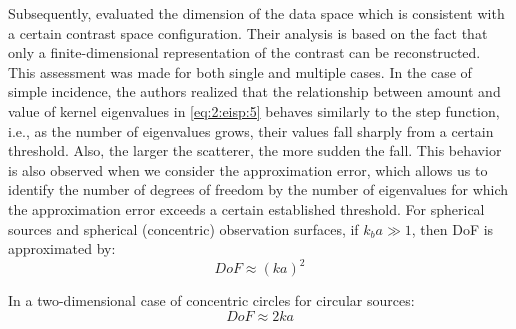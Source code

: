			Subsequently, \cite{bucci1997electromagnetic} evaluated the dimension of the data space which is consistent with a certain contrast space configuration. Their analysis is based on the fact that only a finite-dimensional representation of the contrast can be reconstructed. This assessment was made for both single and multiple cases. In the case of simple incidence, the authors realized that the relationship between amount and value of kernel eigenvalues in \eqref{eq:2:eisp:5} behaves similarly to the step function, i.e., as the number of eigenvalues grows, their values fall sharply from a certain threshold. Also, the larger the scatterer, the more sudden the fall. This behavior is also observed when we consider the approximation error, which allows us to identify the number of degrees of freedom by the number of eigenvalues for which the approximation error exceeds a certain established threshold. For spherical sources and spherical (concentric) observation surfaces, if $k_ba \gg 1$, then DoF is approximated by:
			\begin{equation}
				DoF \approx (ka)^2 \label{eq:2:dof:2}
			\end{equation}
		
			In a two-dimensional case of concentric circles for circular sources:
			\begin{equation}
				DoF \approx 2ka \label{eq:2:dof:3}
			\end{equation}
		
